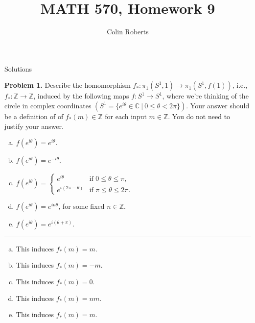\documentclass[leqno]{article}
\author{Colin Roberts}
\title{MATH 570, Homework 9}
\theoremstyle{nonumberplain}
\newcommand{\Z}{\ensuremath{\mathbb{Z}}}
\begin{document}
\maketitle
\begin{large}
\begin{center}
Solutions
\end{center}
\end{large}
\pagebreak


\noindent\textbf{Problem 1.}  Describe the homomorphism $f_* \colon \pi_1 (S^1,1)\to \pi_1 (S^1,f(1))$, i.e., $f_* \colon \Z \to \Z$, induced by the following maps $f\colon S^1 \to S^1$, where we're thinking of the circle in complex coordinates $(S^1=\{e^{i\theta} \in \mathbb{C} ~\vert~ 0 \leq \theta < 2\pi\})$. Your answer should be a definition of of $f_* (m)\in \Z$ for each input $m\in \Z$. You do not need to justify your answer.
\begin{enumerate}[(a)]
\item $f(e^{i\theta})=e^{i\theta}$.
\item $f(e^{i\theta})=e^{-i\theta}$.
\item $f(e^{i\theta})=\begin{cases}
e^{i\theta} & \textrm{if $0\leq \theta \leq \pi$},\\
e^{i(2\pi - \theta)} & \textrm{if $\pi \leq \theta \leq 2\pi$.}
\end{cases}$
\item $f(e^{i\theta})=e^{in\theta}$, for some fixed $n\in \Z$.
\item $f(e^{i\theta})=e^{i(\theta+\pi)}$.
\end{enumerate}

\noindent\rule[0.5ex]{\linewidth}{1pt}

\begin{enumerate}[(a)]
\item This induces $f_*(m)=m$.
\item This induces $f_*(m)=-m$.
\item This induces $f_*(m)=0$.
\item This induces $f_*(m)=nm$.
\item This induces $f_*(m)=m$.
\end{enumerate}
\end{document}
